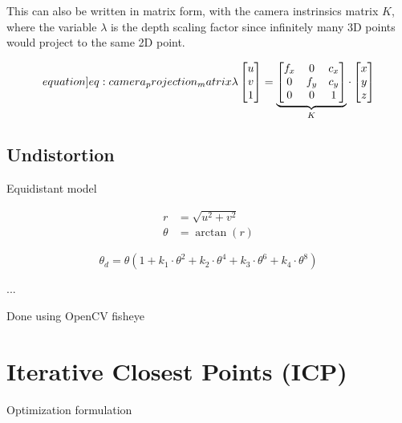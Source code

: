 This can also be written in matrix form, with the camera instrinsics matrix $K$, where the variable $\lambda$ is the depth scaling factor since infinitely many 3D points would project to the same 2D point.

\begin{equation}
    \label[equation]{eq:camera_projection_matrix}
    \lambda \begin{bmatrix} u \\ v \\ 1 \end{bmatrix} = \underbrace{\begin{bmatrix} f_x & 0 & c_x\\ 0 & f_y & c_y \\ 0 & 0 & 1 \end{bmatrix}}_K \cdot \begin{bmatrix} x \\ y \\ z \end{bmatrix}
\end{equation}


\subsection{Undistortion}
\label{sec:undistortion}

Equidistant model

\begin{align}
    r &= \sqrt{u^2 + v^2} \\
    \theta &= \arctan(r)
\end{align}

\begin{equation}
    \theta_d = \theta (1+ k_1\cdot\theta^2 + k_2\cdot\theta^4 + k_3\cdot\theta^6 + k_4\cdot\theta^8)
\end{equation}

...

Done using OpenCV fisheye

\section{Iterative Closest Points (ICP)}
\label{sec:iterative_closest_points}

Optimization formulation

